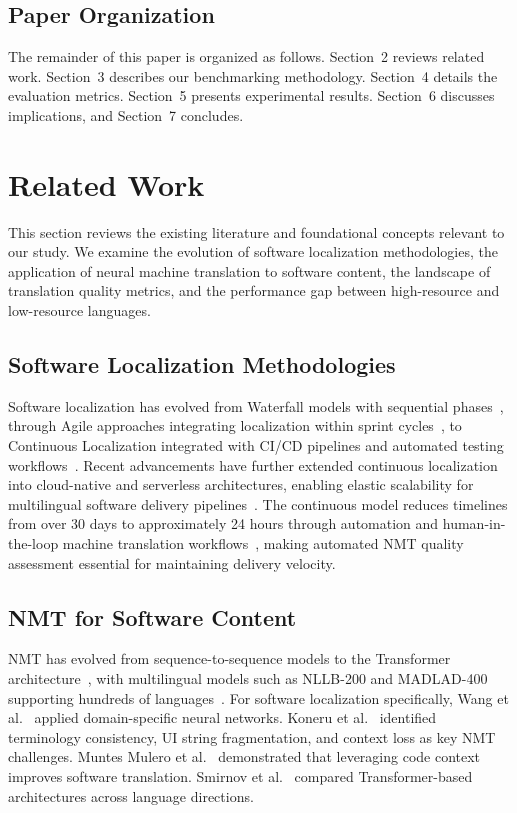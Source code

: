\documentclass[pdflatex,sn-mathphys-num]{sn-jnl}
\begin{document}
\subsection{Paper Organization}

The remainder of this paper is organized as follows. Section~2 reviews related work. Section~3 describes our benchmarking methodology. Section~4 details the evaluation metrics. Section~5 presents experimental results. Section~6 discusses implications, and Section~7 concludes.

\section{Related Work}

This section reviews the existing literature and foundational concepts relevant to our study. We examine the evolution of software localization methodologies, the application of neural machine translation to software content, the landscape of translation quality metrics, and the performance gap between high-resource and low-resource languages.

\subsection{Software Localization Methodologies}

Software localization has evolved from Waterfall models with sequential phases~\cite{11,12,35}, through Agile approaches integrating localization within sprint cycles~\cite{13,14,36}, to Continuous Localization integrated with CI/CD pipelines and automated testing workflows~\cite{5,6,37,38}. Recent advancements have further extended continuous localization into cloud-native and serverless architectures, enabling elastic scalability for multilingual software delivery pipelines~\cite{7}. The continuous model reduces timelines from over 30 days to approximately 24 hours through automation and human-in-the-loop machine translation workflows~\cite{15,16,39}, making automated NMT quality assessment essential for maintaining delivery velocity.

\subsection{NMT for Software Content}

NMT has evolved from sequence-to-sequence models to the Transformer architecture~\cite{8}, with multilingual models such as NLLB-200 and MADLAD-400 supporting hundreds of languages~\cite{17}. For software localization specifically, Wang et al.~\cite{18} applied domain-specific neural networks. Koneru et al.~\cite{9} identified terminology consistency, UI string fragmentation, and context loss as key NMT challenges. Muntes Mulero et al.~\cite{10} demonstrated that leveraging code context improves software translation. Smirnov et al.~\cite{19} compared Transformer-based architectures across language directions.
\end{document}
